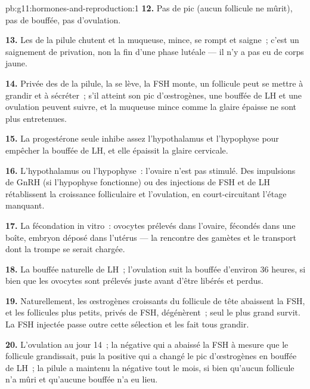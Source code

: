 \begin{solution}{pb:g11:hormones-and-reproduction:1}
\textbf{12.} Pas de pic (aucun follicule ne mûrit), pas de bouffée, pas d'ovulation.

\textbf{13.} Les  de la pilule chutent et la muqueuse, mince,
se rompt et saigne~; c'est un saignement de privation, non la fin d'une
phase lutéale --- il n'y a pas eu de corps jaune.

\textbf{14.} Privée des  de la pilule, la  se lève,
la FSH monte, un follicule peut se mettre à grandir et à sécréter~; s'il
atteint son pic d'œstrogènes, une bouffée de LH et une ovulation
peuvent suivre, et la muqueuse mince comme la glaire épaisse ne sont
plus entretenues.

\textbf{15.} La progestérone seule inhibe assez l'hypothalamus et
l'hypophyse pour empêcher la bouffée de LH, et elle épaissit la glaire
cervicale.

\textbf{16.} L'hypothalamus ou l'hypophyse~: l'ovaire n'est pas
stimulé. Des impulsions de GnRH (si l'hypophyse fonctionne) ou des
injections de FSH et de LH rétablissent la croissance folliculaire et
l'ovulation, en court-circuitant l'étage manquant.

\textbf{17.} La fécondation in vitro~: ovocytes prélevés dans l'ovaire,
fécondés dans une boîte, embryon déposé dans l'utérus --- la rencontre
des gamètes et le transport dont la trompe se serait chargée.

\textbf{18.} La bouffée naturelle de LH~; l'ovulation suit la bouffée
d'environ 36 heures, si bien que les ovocytes sont prélevés juste avant
d'être libérés et perdus.

\textbf{19.} Naturellement, les œstrogènes croissants du follicule de
tête abaissent la FSH, et les follicules plus petits, privés de FSH,
dégénèrent~; seul le plus grand survit. La FSH injectée passe outre
cette sélection et les fait tous grandir.

\textbf{20.} L'ovulation au jour 14~; la  négative qui a
abaissé la FSH à mesure que le follicule grandissait, puis la
 positive qui a changé le pic d'œstrogènes en bouffée de
LH~; la pilule a maintenu la  négative tout le mois, si bien
qu'aucun follicule n'a mûri et qu'aucune bouffée n'a eu lieu.
\end{solution}
